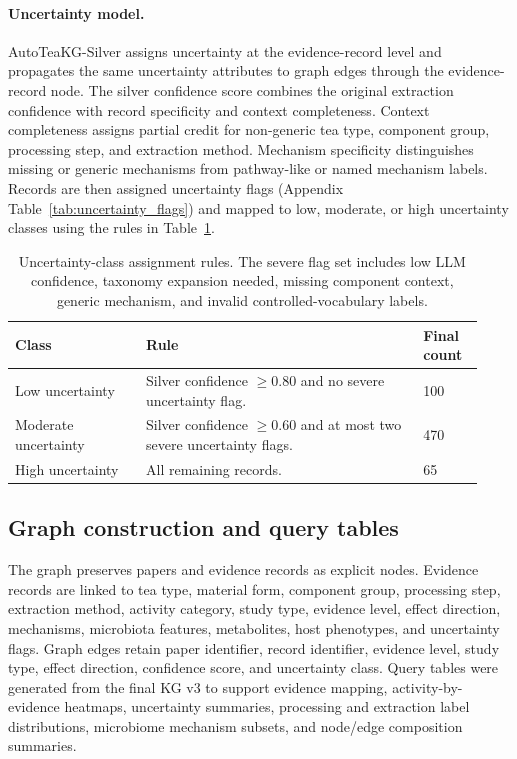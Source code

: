\documentclass[11pt]{article}
\begin{document}
\paragraph{Uncertainty model.}
AutoTeaKG-Silver assigns uncertainty at the evidence-record level and propagates the same uncertainty attributes to graph edges through the evidence-record node. The silver confidence score combines the original extraction confidence with record specificity and context completeness. Context completeness assigns partial credit for non-generic tea type, component group, processing step, and extraction method. Mechanism specificity distinguishes missing or generic mechanisms from pathway-like or named mechanism labels. Records are then assigned uncertainty flags (Appendix Table~\ref{tab:uncertainty_flags}) and mapped to low, moderate, or high uncertainty classes using the rules in Table~\ref{tab:uncertainty_classes}.

\begin{table}[t]
\centering
\small
\caption{Uncertainty-class assignment rules. The severe flag set includes low LLM confidence, taxonomy expansion needed, missing component context, generic mechanism, and invalid controlled-vocabulary labels.}
\label{tab:uncertainty_classes}
\begin{tabular}{p{0.26\linewidth}p{0.55\linewidth}p{0.12\linewidth}}
\toprule
Class & Rule & Final count \\
\midrule
Low uncertainty & Silver confidence $\geq 0.80$ and no severe uncertainty flag. & 100 \\
Moderate uncertainty & Silver confidence $\geq 0.60$ and at most two severe uncertainty flags. & 470 \\
High uncertainty & All remaining records. & 65 \\
\bottomrule
\end{tabular}
\end{table}

\subsection{Graph construction and query tables}

The graph preserves papers and evidence records as explicit nodes. Evidence records are linked to tea type, material form, component group, processing step, extraction method, activity category, study type, evidence level, effect direction, mechanisms, microbiota features, metabolites, host phenotypes, and uncertainty flags. Graph edges retain paper identifier, record identifier, evidence level, study type, effect direction, confidence score, and uncertainty class. Query tables were generated from the final KG v3 to support evidence mapping, activity-by-evidence heatmaps, uncertainty summaries, processing and extraction label distributions, microbiome mechanism subsets, and node/edge composition summaries.
\end{document}
